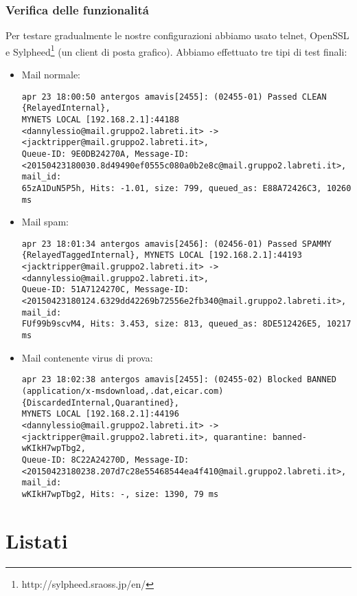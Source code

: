 \documentclass[9pt, a4paper, oneside]{article}
\begin{document}
		\section{Verifica delle funzionalit\'a}
			\par
				Per testare gradualmente le nostre 
				configurazioni abbiamo usato telnet, OpenSSL e 
				Sylpheed\footnote{http://sylpheed.sraoss.jp/en/} 
				(un client di posta grafico). Abbiamo 
				effettuato tre tipi di test finali:
				\begin{itemize}
					\item
						Mail normale:
						\begin{verbatim}
apr 23 18:00:50 antergos amavis[2455]: (02455-01) Passed CLEAN {RelayedInternal},
MYNETS LOCAL [192.168.2.1]:44188 
<dannylessio@mail.gruppo2.labreti.it> -> <jacktripper@mail.gruppo2.labreti.it>, 
Queue-ID: 9E0DB24270A, Message-ID: 
<20150423180030.8d49490ef0555c080a0b2e8c@mail.gruppo2.labreti.it>, mail_id: 
65zA1DuN5P5h, Hits: -1.01, size: 799, queued_as: E88A72426C3, 10260 ms
						\end{verbatim}
					\item
						Mail spam:
						\begin{verbatim}
apr 23 18:01:34 antergos amavis[2456]: (02456-01) Passed SPAMMY 
{RelayedTaggedInternal}, MYNETS LOCAL [192.168.2.1]:44193 
<jacktripper@mail.gruppo2.labreti.it> -> <dannylessio@mail.gruppo2.labreti.it>, 
Queue-ID: 51A7124270C, Message-ID: 
<20150423180124.6329dd42269b72556e2fb340@mail.gruppo2.labreti.it>, mail_id: 
FUf99b9scvM4, Hits: 3.453, size: 813, queued_as: 8DE512426E5, 10217 ms
						\end{verbatim}
					\item
						Mail contenente virus di prova:
						\begin{verbatim}
apr 23 18:02:38 antergos amavis[2455]: (02455-02) Blocked BANNED 
(application/x-msdownload,.dat,eicar.com) {DiscardedInternal,Quarantined}, 
MYNETS LOCAL [192.168.2.1]:44196 <dannylessio@mail.gruppo2.labreti.it> -> 
<jacktripper@mail.gruppo2.labreti.it>, quarantine: banned-wKIkH7wpTbg2, 
Queue-ID: 8C22A24270D, Message-ID: 
<20150423180238.207d7c28e55468544ea4f410@mail.gruppo2.labreti.it>, mail_id: 
wKIkH7wpTbg2, Hits: -, size: 1390, 79 ms		                                                                  
						\end{verbatim}
				\end{itemize}
		\newpage		
	\part{Listati}
\end{document}
